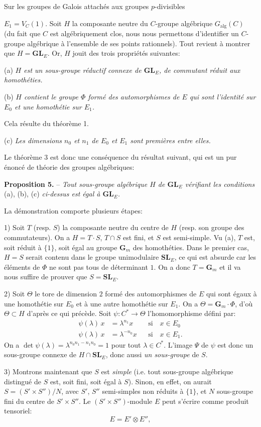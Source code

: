 \begin{center}\small Sur les groupes de Galois attachés aux groupes $p$-divisibles\end{center}
$E_1=V_C(1)$. Soit $H$ la composante neutre du $C$-groupe algébrique $G_{\mathrm{alg}}(C)$ (du fait que $C$ est algébriquement clos, nous nous permettons d’identifier un $C$-groupe algébrique à l’ensemble de ses points rationnels). Tout revient à montrer que $H=\mathbf{GL}_E$. Or, $H$ jouit des trois propriétés suivantes:

(a) \textit{$H$ est un sous-groupe réductif connexe de $\mathbf{GL}_E$, de commutant réduit aux homothéties.}

(b) \textit{$H$ contient le groupe $\varPhi$ formé des automorphismes de $E$ qui sont l’identité sur $E_0$ et une homothétie sur $E_1$.}

Cela résulte du théorème 1.

(c) \textit{Les dimensions $n_0$ et $n_1$ de $E_0$ et $E_1$ sont premières entre elles.}

Le théorème 3 est donc une conséquence du résultat suivant, qui est un pur énoncé de théorie des groupes algébriques:

\textbf{Proposition 5.} -- \textit{Tout sous-groupe algébrique $H$ de $\mathbf{GL}_E$ vérifiant les conditions} (a), (b), (c) \textit{ci-dessus est égal à $\mathbf{GL}_E$.}

La démonstration comporte plusieurs étapes:

1) Soit $T$ (resp. $S$) la composante neutre du centre de $H$ (resp. son groupe des commutateurs). On a $H=T\cdot S$, $T\cap S$ est fini, et $S$ est semi-simple. Vu (a), $T$ est, soit réduit à $\{1\}$, soit égal au groupe $\mathbf{G}_m$ des homothéties. Dans le premier cas, $H=S$ serait contenu dans le groupe unimodulaire $\mathbf{SL}_E$, ce qui est absurde car les éléments de $\varPhi$ ne sont pas tous de déterminant $1$. On a donc $T=\mathbf{G}_m$ et il va nous suffire de prouver que $S=\mathbf{SL}_E$.

2) Soit $\varTheta$ le tore de dimension $2$ formé des automorphismes de $E$ qui sont égaux à une homothétie sur $E_0$ et à une autre homothétie sur $E_1$. On a $\varTheta=\mathbf{G}_m\cdot\varPhi$, d’où $\varTheta\subset H$ d’après ce qui précède. Soit $\psi:C^*\to\varTheta$ l’homomorphisme défini par:
\[
\begin{aligned}
\psi(\lambda)\,x&=\lambda^{n_1}x &&\text{si}\quad x\in E_0\\
\psi(\lambda)\,x&=\lambda^{-n_0}x &&\text{si}\quad x\in E_1.
\end{aligned}
\]
On a $\det\psi(\lambda)=\lambda^{n_0n_1-n_1n_0}=1$ pour tout $\lambda\in C^*$. L’image $\varPsi$ de $\psi$ est donc un sous-groupe connexe de $H\cap\mathbf{SL}_E$, donc aussi \textit{un sous-groupe} de $S$.

3) Montrons maintenant que $S$ est \textit{simple} (i.e. tout sous-groupe algébrique distingué de $S$ est, soit fini, soit égal à $S$). Sinon, en effet, on aurait $S=(S'\times S'')/N$, avec $S'$, $S''$ semi-simples non réduits à $\{1\}$, et $N$ sous-groupe fini du centre de $S'\times S''$. Le $(S'\times S'')$-module $E$ peut s’écrire comme produit tensoriel:
\[
E=E'\otimes E'',
\]
